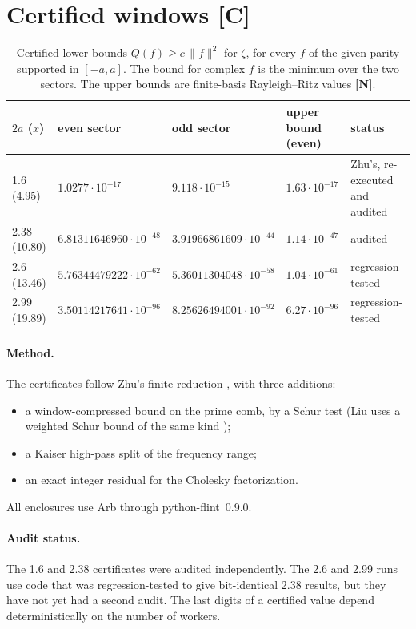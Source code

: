 \documentclass[11pt]{article}
\theoremstyle{remark}
\newcommand{\tagC}{\textbf{[C]}}
\newcommand{\tagN}{\textbf{[N]}}
\begin{document}
\section{Certified windows \tagC}\label{sec:cert}

\begin{table}[h]
\centering\small
\begin{tabular}{@{}llllp{3.0cm}@{}}
\toprule
$2a$ ($x$) & even sector & odd sector & upper bound (even) & status\\
\midrule
1.6 (4.95) & $1.0277\cdot10^{-17}$ & $9.118\cdot10^{-15}$ & $1.63\cdot10^{-17}$ & Zhu's, re-executed and audited\\
2.38 (10.80) & $6.81311646960\cdot10^{-48}$ & $3.91966861609\cdot10^{-44}$ & $1.14\cdot10^{-47}$ & audited\\
2.6 (13.46) & $5.76344479222\cdot10^{-62}$ & $5.36011304048\cdot10^{-58}$ & $1.04\cdot10^{-61}$ & regression-tested\\
2.99 (19.89) & $3.50114217641\cdot10^{-96}$ & $8.25626494001\cdot10^{-92}$ & $6.27\cdot10^{-96}$ & regression-tested\\
\bottomrule
\end{tabular}
\caption{Certified lower bounds $Q(f)\ge c\,\|f\|^2$ for $\zeta$, for every $f$ of the given parity supported in $[-a,a]$. The bound for complex $f$ is the minimum over the two sectors. The upper bounds are finite-basis Rayleigh--Ritz values \tagN.}\label{tab:cert}
\end{table}

\paragraph{Method.} The certificates follow Zhu's finite reduction \cite{zhu26}, with three additions:
\begin{itemize}
\item a window-compressed bound on the prime comb, by a Schur test (Liu uses a weighted Schur bound of the same kind \cite{liu26});
\item a Kaiser high-pass split of the frequency range;
\item an exact integer residual for the Cholesky factorization.
\end{itemize}
All enclosures use Arb through python-flint~0.9.0.

\paragraph{Audit status.} The 1.6 and 2.38 certificates were audited independently. The 2.6 and 2.99 runs use code that was regression-tested to give bit-identical 2.38 results, but they have not yet had a second audit. The last digits of a certified value depend deterministically on the number of workers.
\end{document}

